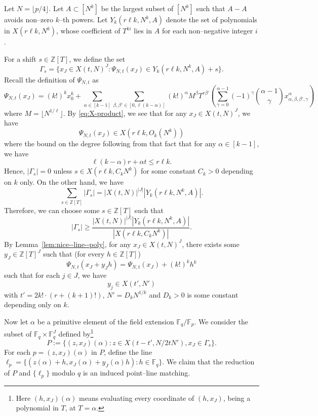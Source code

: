 \documentclass[12pt,reqno]{amsart}
\theoremstyle{plain}
\theoremstyle{definition}
\newcommand{\F}{\mathbb{F}}
\newcommand{\Z}{\mathbb{Z}}
\newcommand{\1}{\mathbf{1}}
\newcommand{\abs}[1]{\left|#1\right|}
\begin{document}
Let $N = \lfloor{p / 4\rfloor}$. Let $A \subset [N^k]$ be the largest subset of $[N^k]$ such that $A - A$ avoids non--zero $k$--th powers. Let $Y_k(r \ell k, N^k, A)$ denote the set of polynomials in $X(r \ell k, N^k)$, whose coefficient of $T^{ki}$ lies in $A$ for each non--negative integer $i$.  

For a shift $s \in \Z[T]$, we define the set
$$\Gamma_s = \{x_J \in X(t, N)^{J}: \Psi_{N,t}(x_J) \in Y_k(r \ell k, N^k, A) + s\}.$$
Recall the definition of $\Psi_{N,t}$ as
$$\Psi_{N,t}(x_J) = (k!)^{k} x_0^k + \sum_{\alpha \in [k - 1]}\sum_{\beta, \beta' \in [0, \ell (k - \alpha)]}(k!)^{\alpha} M^{\beta} T^{r \beta'} \left(\sum_{\gamma = 0}^{\alpha - 1} (-1)^{\gamma} \binom{\alpha - 1}{\gamma} x_{\alpha, \beta, \beta', \gamma}^{\alpha}\right)$$
where $M = \lfloor{N^{1 /\ell}\rfloor}$. By \eqref{eq:X-product}, we see that for any $x_J \in X(t, N)^{J}$, we have
$$\Psi_{N,t}(x_J) \in X\left(r \ell k, O_k(N^k)\right)$$
where the bound on the degree following from that fact that for any $\alpha \in [k - 1]$, we have
$$\ell (k - \alpha) r + \alpha t \leq r \ell k.$$
Hence, $\abs{\Gamma_s} = 0$ unless $s \in X(r \ell k, C_k N^k)$ for some constant $C_k > 0$ depending on $k$ only. On the other hand, we have
$$\sum_{s \in \Z[T]} \abs{\Gamma_s} = \abs{X(t, N)}^{\abs{J}} \abs{Y_k(r \ell k, N^k, A)}.$$
Therefore, we can choose some $s \in \Z[T]$ such that
$$\abs{\Gamma_s} \geq \frac{\abs{X(t, N)}^{\abs{J}}\abs{Y_k(r \ell k, N^k, A)}}{\abs{X(r \ell k, C_k N^k)}}.$$
By Lemma~\ref{lem:nice--line--poly}, for any $x_J \in X(t, N)^J$, there exists some $y_J \in \Z[T]^J$ such that (for every $h\in\Z[T]$)
$$\Psi_{N,t}(x_J + y_J h) = \Psi_{N,t}(x_J) + (k!)^{k}h^k$$
such that for each $j \in J$, we have
$$y_j \in X(t', N')$$ 
with $t' = 2k! \cdot (r + (k + 1)!)$, $N' = D_k N^{1 / k}$ and $D_k > 0$ is some constant depending only on $k$.

Now let $\alpha$ be a primitive element of the field extension $\F_q / \F_p$.
We consider the subset of $\F_q \times \F_q^J$ defined by\footnote{Here $(h, x_J)(\alpha)$ means evaluating every coordinate of $(h, x_J)$, being a polynomial in $T$, at $T = \alpha$.}
$$P := \{(z, x_J)(\alpha): z \in X(t - t', N / 2tN'), x_J \in \Gamma_s\}.$$
For each $p = (z, x_J)(\alpha)$ in $P$, define the line $\ell_p = \{(z(\alpha) + h, x_J(\alpha) + y_J(\alpha) h): h \in \F_q\}$. We claim that the reduction of $P$ and $\{\ell_p\}$ modulo $q$ is an induced point--line matching.
\end{document}
